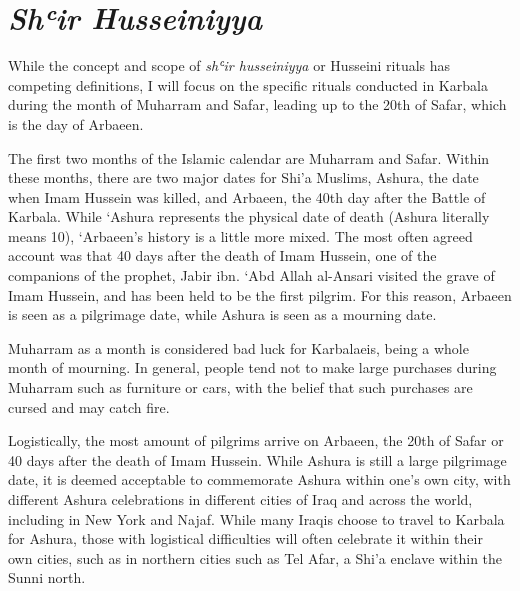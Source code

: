 \section{\emph{Shʿir Husseiniyya}}
While the concept and scope of \emph{shʿir husseiniyya} or Husseini rituals has competing definitions, I will focus on the specific rituals conducted in Karbala during the month of Muharram and Safar, leading up to the 20th of Safar, which is the day of Arbaeen. 

The first two months of the Islamic calendar are Muharram and Safar. Within these months, there are two major dates for Shi’a Muslims, Ashura, the date when Imam Hussein was killed, and Arbaeen, the 40th day after the Battle of Karbala. While ‘Ashura represents the physical date of death (Ashura literally means 10), ‘Arbaeen’s history is a little more mixed. The most often agreed account was that 40 days after the death of Imam Hussein, one of the companions of the prophet, Jabir ibn. ‘Abd Allah al-Ansari visited the grave of Imam Hussein, and has been held to be the first pilgrim. For this reason, Arbaeen is seen as a pilgrimage date, while Ashura is seen as a mourning date. 


Muharram as a month is considered bad luck for Karbalaeis, being a whole month of mourning. In general, people tend not to make large purchases during Muharram such as furniture or cars, with the belief that such purchases are cursed and may catch fire. 

Logistically, the most amount of pilgrims arrive on Arbaeen, the 20th of Safar or 40 days after the death of Imam Hussein. While Ashura is still a large pilgrimage date, it is deemed acceptable to commemorate Ashura within one’s own city, with different Ashura celebrations in different cities of Iraq and across the world, including in New York and Najaf. While many Iraqis choose to travel to Karbala for Ashura, those with logistical difficulties will often celebrate it within their own cities, such as in northern cities such as Tel Afar, a Shi'a enclave within the Sunni north.  

